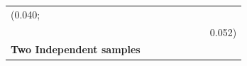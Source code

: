 \documentclass[11pt,a4paper,openany]{book}
\begin{document}
\begin{longtable}[]{@{}lrrrrrrr@{}}
\begin{minipage}[t]{0.07\columnwidth}
(0.040;\strut
\end{minipage}\tabularnewline
\begin{minipage}[t]{0.35\columnwidth}\raggedright\strut
\strut
\end{minipage} & \begin{minipage}[t]{0.05\columnwidth}\raggedleft\strut
\strut
\end{minipage} & \begin{minipage}[t]{0.04\columnwidth}\raggedleft\strut
\strut
\end{minipage} & \begin{minipage}[t]{0.06\columnwidth}\raggedleft\strut
\strut
\end{minipage} & \begin{minipage}[t]{0.11\columnwidth}\raggedleft\strut
\strut
\end{minipage} & \begin{minipage}[t]{0.05\columnwidth}\raggedleft\strut
\strut
\end{minipage} & \begin{minipage}[t]{0.05\columnwidth}\raggedleft\strut
\strut
\end{minipage} & \begin{minipage}[t]{0.07\columnwidth}\raggedleft\strut
0.052)\strut
\end{minipage}\tabularnewline
\begin{minipage}[t]{0.35\columnwidth}\raggedright\strut
\textbf{Two Independent samples}\strut
\end{minipage} & \begin{minipage}[t]{0.05\columnwidth}\raggedleft\strut
\strut
\end{minipage} & \begin{minipage}[t]{0.04\columnwidth}\raggedleft\strut
\strut
\end{minipage} & \begin{minipage}[t]{0.06\columnwidth}\raggedleft\strut
\strut
\end{minipage} & \begin{minipage}[t]{0.11\columnwidth}\raggedleft\strut
\strut
\end{minipage} & \begin{minipage}[t]{0.05\columnwidth}\raggedleft\strut
\strut
\end{minipage} & \begin{minipage}[t]{0.05\columnwidth}\raggedleft\strut
\strut
\end{minipage} & \begin{minipage}[t]{0.07\columnwidth}\raggedleft\strut

\end{minipage}
\end{longtable}
\end{document}

